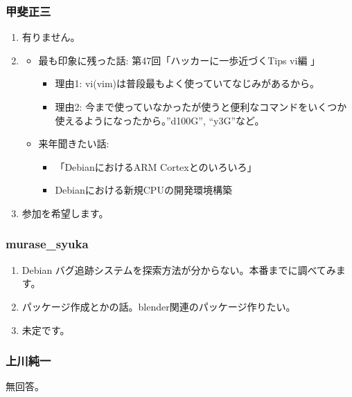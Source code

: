 \documentclass[cjk,dvipdfmx,10pt,%
hyperref={bookmarks=true,bookmarksnumbered=true,bookmarksopen=false,%
colorlinks=false,%
pdftitle={第 54 回 関西 Debian 勉強会},%
pdfauthor={倉敷・のがた・佐々木},%
pdfsubject={資料},%
}]{beamer}
\begin{document}
\begin{frame}[fragile]
\frametitle{ 甲斐正三 }
  \begin{enumerate}
  \item 有りません。
  \item
    \begin{itemize}
    \item 最も印象に残った話: 第47回「ハッカーに一歩近づくTips vi編 」
      \begin{itemize}
      \item 理由1: vi(vim)は普段最もよく使っていてなじみがあるから。
      \item 理由2: 今まで使っていなかったが使うと便利なコマンドをいくつか使えるようになったから。''d100G'', ``y3G''など。
      \end{itemize}
    \item 来年聞きたい話:
      \begin{itemize}
      \item 「DebianにおけるARM Cortexとのいろいろ」
      \item Debianにおける新規CPUの開発環境構築
      \end{itemize}
    \end{itemize}
  \item 参加を希望します。
  \end{enumerate}
\end{frame}

\begin{frame}[fragile]
\frametitle{ murase\_syuka }
  \begin{enumerate}
  \item Debian バグ追跡システムを探索方法が分からない。本番までに調べてみます。
  \item パッケージ作成とかの話。blender関連のパッケージ作りたい。
  \item 未定です。
  \end{enumerate}
\end{frame}

\begin{frame}[fragile]
\frametitle{ 上川純一 }
  無回答。
\end{frame}
\end{document}

